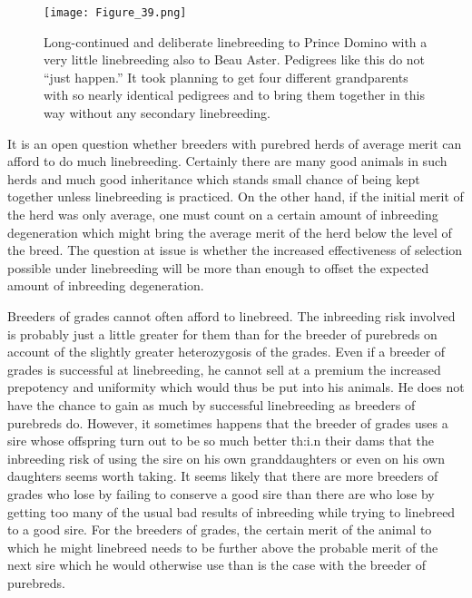 \begin{figure}
	\centering
    \texttt{[image: Figure\_39.png]}
    \caption{Long-continued and deliberate linebreeding to Prince Domino with a
			 very little linebreeding also to Beau Aster. Pedigrees like this do
			 not ``just happen.'' It took planning to get four different
			 grandparents with so nearly identical pedigrees and to bring them
			 together in this way without any secondary linebreeding.}
    \label{fig:Lush_Figure_39}
\end{figure}

\nowidow
It is an open question whether breeders with purebred herds of average
merit can afford to do much linebreeding. Certainly there are many
good animals in such herds and much good inheritance which stands
small chance of being kept together unless linebreeding is practiced. On
the other hand, if the initial merit of the herd was only average, one
must count on a certain amount of inbreeding degeneration which
might bring the average merit of the herd below the level of the breed.
The question at issue is whether the increased effectiveness of selection
possible under linebreeding will be more than enough to offset the
expected amount of inbreeding degeneration.

Breeders of grades cannot often afford to linebreed. The inbreeding
risk involved is probably just a little greater for them than for the
breeder of purebreds on account of the slightly greater heterozygosis of
the grades. Even if a breeder of grades is successful at linebreeding, he
cannot sell at a premium the increased prepotency and uniformity
which would thus be put into his animals. He does not have the chance
to gain as much by successful linebreeding as breeders of purebreds do.
However, it sometimes happens that the breeder of grades uses a sire
whose offspring turn out to be so much better th:i.n their dams that the
inbreeding risk of using the sire on his own granddaughters or even on
his own daughters seems worth taking. It seems likely that there are
more breeders of grades who lose by failing to conserve a good sire than
there are who lose by getting too many of the usual bad results of
inbreeding while trying to linebreed to a good sire. For the breeders of
grades, the certain merit of the animal to which he might linebreed
needs to be further above the probable merit of the next sire which he
would otherwise use than is the case with the breeder of purebreds.

